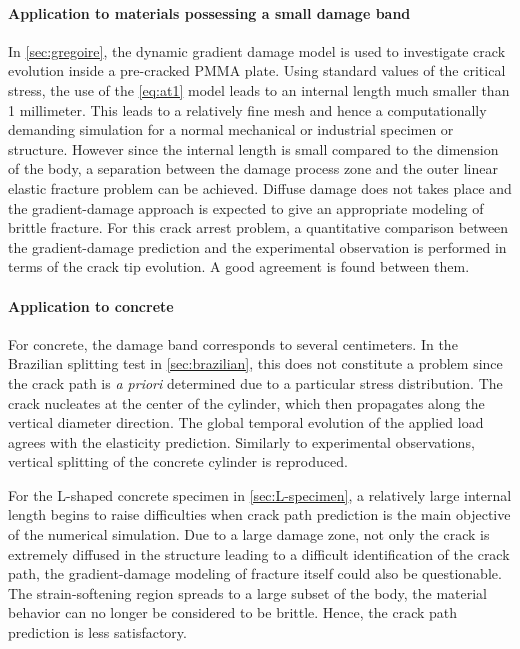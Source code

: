 \paragraph{Application to materials possessing a small damage band} In \cref{sec:gregoire}, the dynamic gradient damage model is used to investigate crack evolution inside a pre-cracked PMMA plate. Using standard values of the critical stress, the use of the \eqref{eq:at1} model leads to an internal length much smaller than 1 millimeter. This leads to a relatively fine mesh and hence a computationally demanding simulation for a normal mechanical or industrial specimen or structure. However since the internal length is small compared to the dimension of the body, a separation between the damage process zone and the outer linear elastic fracture problem can be achieved. Diffuse damage does not takes place and the gradient-damage approach is expected to give an appropriate modeling of brittle fracture. For this crack arrest problem, a quantitative comparison between the gradient-damage prediction and the experimental observation is performed in terms of the crack tip evolution. A good agreement is found between them.

\paragraph{Application to concrete} For concrete, the damage band corresponds to several centimeters. In the Brazilian splitting test in \cref{sec:brazilian}, this does not constitute a problem since the crack path is \emph{a priori} determined due to a particular stress distribution. The crack nucleates at the center of the cylinder, which then propagates along the vertical diameter direction. The global temporal evolution of the applied load agrees with the elasticity prediction. Similarly to experimental observations, vertical splitting of the concrete cylinder is reproduced.

For the L-shaped concrete specimen in \cref{sec:L-specimen}, a relatively large internal length begins to raise difficulties when crack path prediction is the main objective of the numerical simulation. Due to a large damage zone, not only the crack is extremely diffused in the structure leading to a difficult identification of the crack path, the gradient-damage modeling of fracture itself could also be questionable. The strain-softening region spreads to a large subset of the body, the material behavior can no longer be considered to be brittle. Hence, the crack path prediction is less satisfactory.

